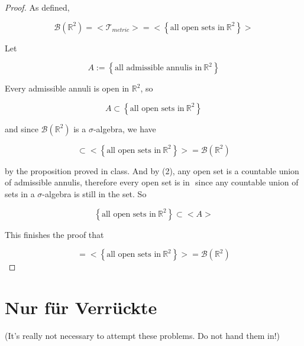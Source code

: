 \begin{proof}

As defined,

\[\mathcal{B}(\mathbb{R}^{2}) = < \mathcal{T}_{metric} > = < \left\{ {\text{all open sets in}\ \mathbb{R}^{2}} \right\} >\]

Let

\[A := \left\{ {\text{all admissible annulis in}\ \mathbb{R}^{2}} \right\}\]

Every admissible annuli is open in \(\mathbb{R}^{2}\), so

\[A \subset \left\{ {\text{all open sets in}\ \mathbb{R}^{2}} \right\}\]

and since \(\mathcal{B}(\mathbb{R}^{2})\) is a \(\sigma\)-algebra, we have

\[< A > \subset < \left\{ {\text{all open sets in}\ \mathbb{R}^{2}} \right\} > = \mathcal{B}(\mathbb{R}^{2})\]

by the proposition proved in class. And by (2), any open set is a countable union of admissible annulis, therefore every open set is in \(< A >\) since any countable union of sets in a \(\sigma\)-algebra is still in the set. So

\[\left\{ {\text{all open sets in}\ \mathbb{R}^{2}} \right\} \subset < A >\]

This finishes the proof that

\[< A > = < \left\{ {\text{all open sets in}\ \mathbb{R}^{2}} \right\} > = \mathcal{B}(\mathbb{R}^{2})\]

\end{proof}

\section{Nur für Verrückte}\label{nur-fuxfcr-verruxfcckte}

(It's really not necessary to attempt these problems. Do not hand them in!)

